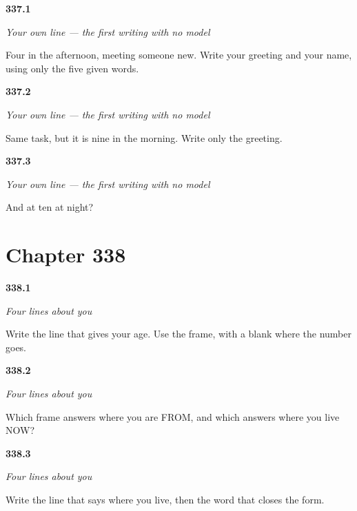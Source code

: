 \noindent\begin{minipage}[t]{\linewidth}
\raggedright
\hypertarget{review-ES-W01-frase-propia-afternoon}{\textbf{337.1}} \emph{Your own line — the first writing with no model}\par
\small Four in the afternoon, meeting someone new. Write your greeting and your name, using only the five given words.
\end{minipage}\par\medskip

\noindent\begin{minipage}[t]{\linewidth}
\raggedright
\hypertarget{review-ES-W01-frase-propia-morning}{\textbf{337.2}} \emph{Your own line — the first writing with no model}\par
\small Same task, but it is nine in the morning. Write only the greeting.
\end{minipage}\par\medskip

\noindent\begin{minipage}[t]{\linewidth}
\raggedright
\hypertarget{review-ES-W01-frase-propia-night}{\textbf{337.3}} \emph{Your own line — the first writing with no model}\par
\small And at ten at night?
\end{minipage}\par\medskip

\section*{Chapter 338}

\noindent\begin{minipage}[t]{\linewidth}
\raggedright
\hypertarget{review-ES-W01-ficha-personal-age}{\textbf{338.1}} \emph{Four lines about you}\par
\small Write the line that gives your age. Use the frame, with a blank where the number goes.
\end{minipage}\par\medskip

\noindent\begin{minipage}[t]{\linewidth}
\raggedright
\hypertarget{review-ES-W01-ficha-personal-from}{\textbf{338.2}} \emph{Four lines about you}\par
\small Which frame answers where you are FROM, and which answers where you live NOW?
\end{minipage}\par\medskip

\noindent\begin{minipage}[t]{\linewidth}
\raggedright
\hypertarget{review-ES-W01-ficha-personal-close}{\textbf{338.3}} \emph{Four lines about you}\par
\small Write the line that says where you live, then the word that closes the form.
\end{minipage}\par\medskip

